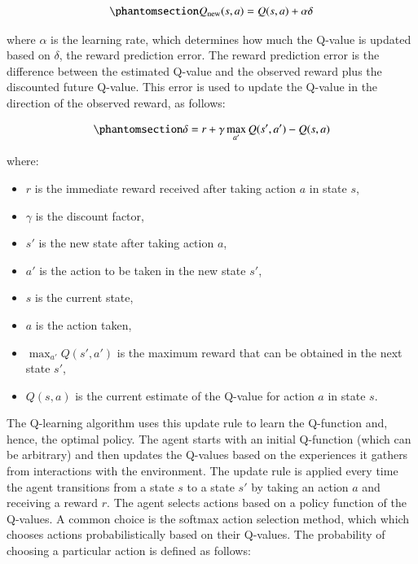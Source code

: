 \documentclass[
  number,
  preprint,
  3p,
  onecolumn]{elsarticle}
\begin{document}
\begin{equation}\phantomsection\label{eq-q-learn}{
Q_\text{new}(s, a) = Q(s, a) + \alpha \delta
}\end{equation}

where \(\alpha\) is the learning rate, which determines how much the
Q-value is updated based on \(\delta\), the reward prediction error. The
reward prediction error is the difference between the estimated Q-value
and the observed reward plus the discounted future Q-value. This error
is used to update the Q-value in the direction of the observed reward,
as follows:

\begin{equation}\phantomsection\label{eq-RPE}{
\delta = r + \gamma \max_{a'} Q(s', a') - Q(s, a)
}\end{equation}

where:

\begin{itemize}
\item
  \(r\) is the immediate reward received after taking action \(a\) in
  state \(s\),
\item
  \(\gamma\) is the discount factor,
\item
  \(s'\) is the new state after taking action \(a\),
\item
  \(a'\) is the action to be taken in the new state \(s'\),
\item
  \(s\) is the current state,
\item
  \(a\) is the action taken,
\item
  \(\max_{a'} Q(s', a')\) is the maximum reward that can be obtained in
  the next state \(s'\),
\item
  \(Q(s, a)\) is the current estimate of the Q-value for action \(a\) in
  state \(s\).
\end{itemize}

The Q-learning algorithm uses this update rule to learn the Q-function
and, hence, the optimal policy. The agent starts with an initial
Q-function (which can be arbitrary) and then updates the Q-values based
on the experiences it gathers from interactions with the environment.
The update rule is applied every time the agent transitions from a state
\(s\) to a state \(s'\) by taking an action \(a\) and receiving a reward
\(r\). The agent selects actions based on a policy function of the
Q-values. A common choice is the softmax action selection method, which
which chooses actions probabilistically based on their Q-values. The
probability of choosing a particular action is defined as follows:
\end{document}
